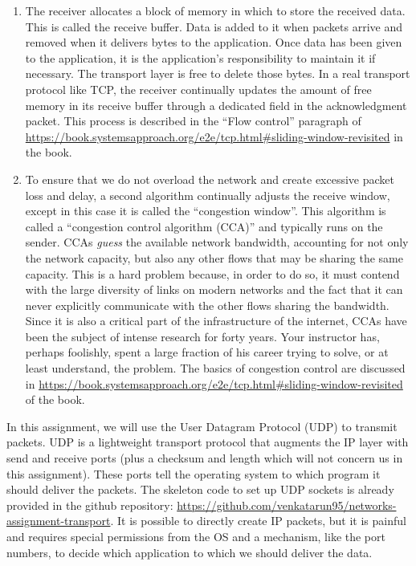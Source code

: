 \documentclass{article}
\begin{document}
\begin{enumerate}
\item The receiver allocates a block of memory in which to store the received data. This is called the receive buffer. Data is added to it when packets arrive and removed when it delivers bytes to the application. Once data has been given to the application, it is the application's responsibility to maintain it if necessary. The transport layer is free to delete those bytes. In a real transport protocol like TCP, the receiver continually updates the amount of free memory in its receive buffer through a dedicated field in the acknowledgment packet. This process is described in the ``Flow control'' paragraph of \hyperref[section 5.2.4]{https://book.systemsapproach.org/e2e/tcp.html#sliding-window-revisited} in the book.
\item To ensure that we do not overload the network and create excessive packet loss and delay, a second algorithm continually adjusts the receive window, except in this case it is called the ``congestion window''. This algorithm is called a ``congestion control algorithm (CCA)'' and typically runs on the sender. CCAs \emph{guess} the available network bandwidth, accounting for not only the network capacity, but also any other flows that may be sharing the same capacity. This is a hard problem because, in order to do so, it must contend with the large diversity of links on modern networks and the fact that it can never explicitly communicate with the other flows sharing the bandwidth. Since it is also a critical part of the infrastructure of the internet, CCAs have been the subject of intense research for forty years. Your instructor has, perhaps foolishly, spent a large fraction of his career trying to solve, or at least understand, the problem. The basics of congestion control are discussed in \hyperref[chapter 6]{https://book.systemsapproach.org/e2e/tcp.html#sliding-window-revisited} of the book.
\end{enumerate}

In this assignment, we will use the User Datagram Protocol (UDP) to transmit packets. UDP is a lightweight transport protocol that augments the IP layer with send and receive ports (plus a checksum and length which will not concern us in this assignment). These ports tell the operating system to which program it should deliver the packets. The skeleton code to set up UDP sockets is already provided in the github repository: \url{https://github.com/venkatarun95/networks-assignment-transport}. It is possible to directly create IP packets, but it is painful and requires special permissions from the OS and a mechanism, like the port numbers, to decide which application to which we should deliver the data.
\end{document}
